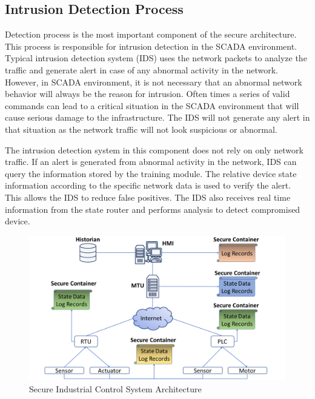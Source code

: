 \documentclass[conference]{IEEEtran}
\begin{document}
\subsection{Intrusion Detection Process}
Detection process is the most important component of the secure architecture. This process is responsible for intrusion detection in the SCADA environment. Typical intrusion detection system (IDS) uses the network packets to analyze the traffic and generate alert in case of any abnormal activity in the network. However, in SCADA environment, it is not necessary that an abnormal network behavior will always be the reason for intrusion. Often times a series of valid commands can lead to a critical situation in the SCADA environment that will cause serious damage to the infrastructure. The IDS will not generate any alert in that situation as the network traffic will not look suspicious or abnormal.
\par The intrusion detection system in this component does not rely on only network traffic. If an alert is generated from abnormal activity in the network, IDS can query the information stored by the training module. The relative device state information according to the specific network data is used to verify the alert. This allows the IDS to reduce false positives. The IDS also receives real time information from the state router and performs analysis to detect compromised device. 
\begin{figure}[htbp]
\centering
\centerline{\includegraphics [width=.5\textwidth]{sec_arch.png}}
\caption{Secure Industrial Control System Architecture}
\label{SICSA}
%
\end{figure}
\end{document}
